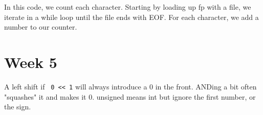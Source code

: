 \documentclass{article}
\begin{document}
In this code, we count each character. Starting by loading up fp with a file, we iterate in a while loop until the file ends with EOF. For each character, we add a number to our counter.

\section*{Week 5}
A left shift if \texttt{~0 << 1} will always introduce a 0 in the front.
ANDing a bit often "squashes" it and makes it 0.
unsigned means int but ignore the first number, or the sign.
\end{document}
